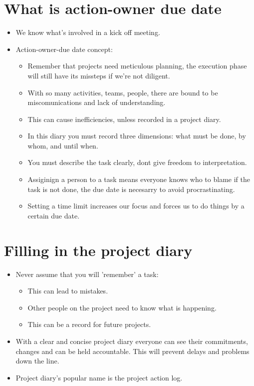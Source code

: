 \section{What is action-owner due date}
\begin{itemize}
    \item We know what's involved in a kick off meeting.
    \item Action-owner-due date concept: 
        \begin{itemize}
            \item Remember that projects need meticulous planning, the execution phase will still have its missteps if we're not diligent.
            \item With so many activities, teams, people, there are bound to be miscomunications and lack of understanding.
            \item This can cause inefficiencies, unless recorded in a project diary.
            \item In this diary you must record three dimensions: what must be done, by whom, and until when.
            \item You must describe the task clearly, dont give freedom to interpretation.
            \item Assiginign a person to a task means everyone knows who to blame if the task is not done, the due date is necesarry to avoid procrastinating.
            \item Setting a time limit increases our focus and forces us to do things by a certain due date.
        \end{itemize}
\end{itemize}

\section{Filling in the project diary}
\begin{itemize}
    \item Never assume that you will 'remember' a task:
        \begin{itemize}
            \item This can lead to mistakes.
            \item Other people on the project need to know what is happening.
            \item This can be a record for future projects.
        \end{itemize}
    
    \item With a clear and concise project diary everyone can see their commitments, changes and can be held accountable. This will prevent delays and problems down the line.
    \item Project diary's popular name is the project action log.
\end{itemize}

